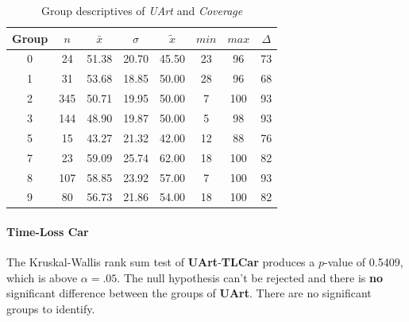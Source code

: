 \begin{table}[ht]
	\tiny
	\centering
    \begin{tabular}{c|c|c|c|c|c|c|c}
        \toprule
        Group & $n$ & $\bar{x}$ & $\sigma$ & $\tilde{x}$ & $min$ & $max$ & $\Delta$ \\
        \midrule
        0 & 24  & 51.38 & 20.70 & 45.50 & 23 & 96  & 73 \\ 
        1 & 31  & 53.68 & 18.85 & 50.00 & 28 & 96  & 68 \\ 
        2 & 345 & 50.71 & 19.95 & 50.00 & 7  & 100 & 93 \\ 
        3 & 144 & 48.90 & 19.87 & 50.00 & 5  & 98  & 93 \\ 
        5 & 15  & 43.27 & 21.32 & 42.00 & 12 & 88  & 76 \\ 
        7 & 23  & 59.09 & 25.74 & 62.00 & 18 & 100 & 82 \\ 
        8 & 107 & 58.85 & 23.92 & 57.00 & 7  & 100 & 93 \\ 
        9 & 80  & 56.73 & 21.86 & 54.00 & 18 & 100 & 82 \\ 
        \bottomrule
      \end{tabular}
    \caption{Group descriptives of \textit{UArt} and \textit{Coverage}}
    \label{tbl:descriptives_baysis_initiator_UArt_Cov}
\end{table}

\paragraph{Time-Loss Car}
The Kruskal-Wallis rank sum test of \textbf{UArt}-\textbf{TLCar} produces a $p$-value of 0.5409, which is above $\alpha=.05$. The null hypothesis can't be rejected and there is \textbf{no} significant difference between the groups of \textbf{UArt}. There are no significant groups to identify.

